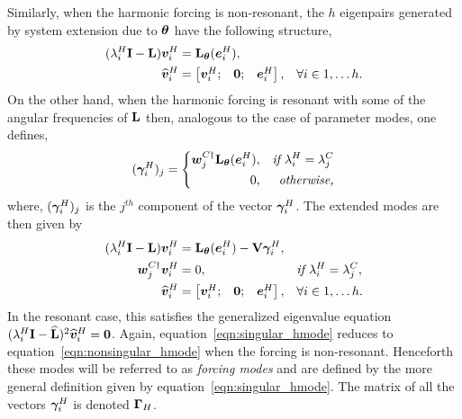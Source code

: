 Similarly, when the harmonic forcing is non-resonant, the $h$ eigenpairs generated by system extension due to $\boldsymbol{\theta}$ have the following structure,
\begin{subequations}
	\label{eqn:nonsingular_hmode} 
	\begin{align}
		(\lambda^{H}_{i}\mathbf{I} - \mathbf{L})\boldsymbol{v}^{H}_{i} &= \mathbf{L}_{\boldsymbol{\theta}}(\boldsymbol{e}^{H}_{i}), &&  \\
		{\widehat{\boldsymbol{v}}}^{H}_{i} &= \begin{bmatrix}
			\boldsymbol{v}^{H}_{i}; &
			\boldsymbol{0}; &
			\boldsymbol{e}^{H}_{i}
		\end{bmatrix}, && \forall i \in 1,\ldots h.
	\end{align}
\end{subequations}
On the other hand, when the harmonic forcing is resonant with some of the angular frequencies of $\mathbf{L}$ then, analogous to the case of parameter modes, one defines, 
\begin{equation}
	(\boldsymbol{\gamma}^{H}_{i})_{j} =
	\left\lbrace
	\begin{split}
		\boldsymbol{w}^{C\dagger}_{j}\mathbf{L}_{\boldsymbol{\theta}}(\boldsymbol{e}^{H}_{i}),  && \textit{if } \lambda^{H}_{i} = \lambda^{C}_{j} \\
		0,						 && \textit{otherwise,}	
	\end{split}\right.
\end{equation}
where, $(\boldsymbol{\gamma}^{H}_{i})_{j}$ is the $j^{th}$ component of the vector $\boldsymbol{\gamma}^{H}_{i}$. The extended modes are then given  by
\begin{subequations}
	\label{eqn:singular_hmode}
	\begin{align}
		(\lambda^{H}_{i}\mathbf{I} - \mathbf{L})\boldsymbol{v}^{H}_{i} &= \mathbf{L}_{\boldsymbol{\theta}}(\boldsymbol{e}^{H}_{i}) - \mathbf{V}\boldsymbol{\gamma}^{H}_{i}, &&   \\
		\boldsymbol{w}^{C\dagger}_{j}\boldsymbol{v}^{H}_{i} &= 0, && \textit{if } \lambda^{H}_{i} = \lambda^{C}_{j}, \\
		{\widehat{\boldsymbol{v}}}^{H}_{i} &= \begin{bmatrix}
			\boldsymbol{v}^{H}_{i}; &
			\boldsymbol{0}; &
			\boldsymbol{e}^{H}_{i}
		\end{bmatrix}, && \forall i \in 1,\ldots h.
	\end{align}
\end{subequations}
In the resonant case, this satisfies the generalized eigenvalue equation $(\lambda^{H}_{i}\mathbf{I} - \mathbf{\widehat{L}})^{2}{\widehat{\boldsymbol{v}}}^{H}_{i} = \boldsymbol{0}$. 
Again, equation~\eqref{eqn:singular_hmode} reduces to equation~\eqref{eqn:nonsingular_hmode} when the forcing is non-resonant. Henceforth these modes will be referred to as \emph{forcing modes} and are defined by the more general definition given by equation~\eqref{eqn:singular_hmode}. The matrix of all the vectors $\boldsymbol{\gamma}^{H}_{i}$ is denoted $\mathbf{\Gamma}_{H}$.
